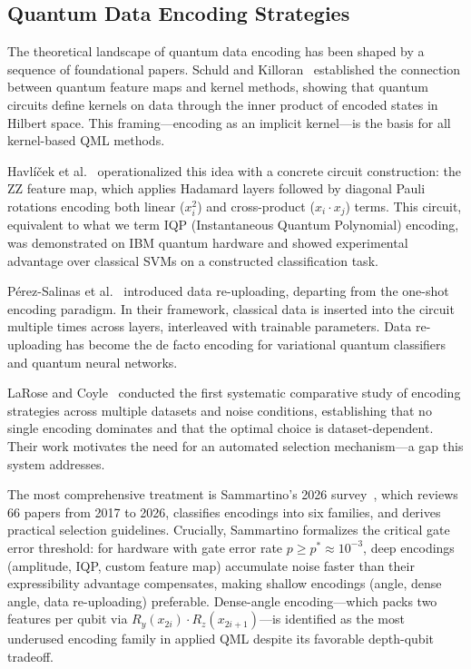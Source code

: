 \documentclass[sigconf,nonacm]{acmart}
\begin{document}
\subsection{Quantum Data Encoding Strategies}

The theoretical landscape of quantum data encoding has been shaped by a sequence of
foundational papers. Schuld and Killoran~\cite{schuld2019} established the
connection between quantum feature maps and kernel methods, showing that quantum
circuits define kernels on data through the inner product of encoded states in
Hilbert space. This framing---encoding as an implicit kernel---is the basis for all
kernel-based QML methods.

Havl\'i\v{c}ek et al.~\cite{havlicek2019} operationalized this idea with a concrete
circuit construction: the ZZ feature map, which applies Hadamard layers followed by
diagonal Pauli rotations encoding both linear ($x_i^2$) and cross-product
($x_i \cdot x_j$) terms. This circuit, equivalent to what we term IQP
(Instantaneous Quantum Polynomial) encoding, was demonstrated on IBM quantum
hardware and showed experimental advantage over classical SVMs on a constructed
classification task.

P\'erez-Salinas et al.~\cite{perezsalinas2020} introduced data re-uploading,
departing from the one-shot encoding paradigm. In their framework, classical data is
inserted into the circuit multiple times across layers, interleaved with trainable
parameters. Data re-uploading has become the de facto encoding for variational
quantum classifiers and quantum neural networks.

LaRose and Coyle~\cite{larose2020} conducted the first systematic comparative study
of encoding strategies across multiple datasets and noise conditions, establishing
that no single encoding dominates and that the optimal choice is dataset-dependent.
Their work motivates the need for an automated selection mechanism---a gap this
system addresses.

The most comprehensive treatment is Sammartino's 2026 survey~\cite{sammartino2026},
which reviews 66 papers from 2017 to 2026, classifies encodings into six families,
and derives practical selection guidelines. Crucially, Sammartino formalizes the
critical gate error threshold: for hardware with gate error rate
$p \geq p^{*} \approx 10^{-3}$, deep encodings (amplitude, IQP, custom feature map)
accumulate noise faster than their expressibility advantage compensates, making
shallow encodings (angle, dense angle, data re-uploading) preferable. Dense-angle
encoding---which packs two features per qubit via
$R_y(x_{2i}) \cdot R_z(x_{2i+1})$---is identified as the most underused encoding
family in applied QML despite its favorable depth-qubit tradeoff.
\end{document}
